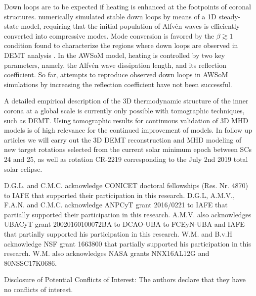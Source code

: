 \documentclass[namedreferences]{solarphysics}
\begin{document}
\begin{article}
Down loops are to be expected if heating is enhanced at the footpoints of coronal structures. \citet{schiff_2016} numerically simulated stable down loops by means of a 1D steady-state model, requiring that the initial population of Alfvén waves is efficiently converted into compressive modes. Mode conversion is favored by the $\beta\gtrsim 1 $ condition found to characterize the regions where down loops are observed in DEMT analysis \citep{nuevo_2013}. In the AWSoM model, heating is controlled by two key parameters, namely, the Alfvén wave dissipation length, and its reflection coefficient. So far, attempts to reproduce observed down loops in AWSoM simulations by increasing the reflection coefficient have not been successful.

A detailed empirical description of the 3D thermodynamic structure of the inner corona at a global scale is currently only possible with tomographic techniques, such as DEMT. Using tomographic results for continuous validation of 3D MHD models is of high relevance for the continued improvement of models. In {follow up articles} we will {carry out the 3D DEMT reconstruction and MHD modeling of} new target rotations {selected from} the current solar minimum {epoch} between SCs 24 and 25, {as well as rotation CR-2219 corresponding to the July 2nd 2019 total solar eclipse.}

\begin{acks}
D.G.L. and C.M.C. {acknowledge} CONICET doctoral {fellowships} (Res. Nr. 4870) to IAFE that supported {their} participation in this research. {D.G.L, A.M.V., F.A.N. and C.M.C. acknowledge ANPCyT grant 2016/0221 to IAFE that partially supported their participation in this research. A.M.V. also acknowledges UBACyT grant 20020160100072BA to DCAO-UBA to FCEyN-UBA and IAFE that partially supported his participation in this research.} W.M. and B.v.H acknowledge NSF grant 1663800 that partially supported his participation in this research. W.M. also acknowledges NASA grants NNX16AL12G and 80NSSC17K0686.
\end{acks}

\begin{footnotesize}
Disclosure of Potential Conflicts of Interest: The authors declare that they have no conflicts of interest.
\end{footnotesize}


  

\end{article} 
\end{document}
